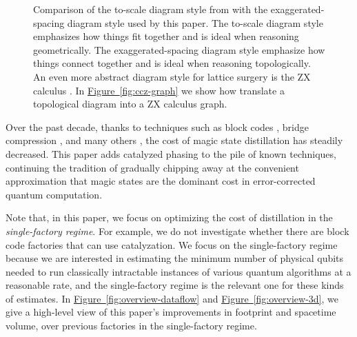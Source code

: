 \documentclass[twocolumn,accepted=2019-03-30]{quantumarticle}
\newcommand{\fig}[1]{\hyperref[fig:#1]{Figure~\ref*{fig:#1}}}
\begin{document}
\begin{figure}
  \label{fig:diagram-style-3d}
  \caption{
    Comparison of the to-scale diagram style from \cite{fowler2018} with the exaggerated-spacing diagram style used by this paper.
    The to-scale diagram style emphasizes how things fit together and is ideal when reasoning geometrically.
    The exaggerated-spacing diagram style emphasize how things connect together and is ideal when reasoning topologically.
    An even more abstract diagram style for lattice surgery is the ZX calculus \cite{de2017}.
    In \fig{ccz-graph} we show how translate a topological diagram into a ZX calculus graph.
  }
\end{figure}

Over the past decade, thanks to techniques such as block codes \cite{bravyi2012, fowler2013}, bridge compression \cite{fowler2012bridge}, and many others \cite{horsman2012, campbell2017, campbell2018, litinski2018}, the cost of magic state distillation has steadily decreased.
This paper adds catalyzed phasing to the pile of known techniques, continuing the tradition of gradually chipping away at the convenient approximation that magic states are the dominant cost in error-corrected quantum computation.

Note that, in this paper, we focus on optimizing the cost of distillation in the {\em single-factory regime}.
For example, we do not investigate whether there are block code factories that can use catalyzation.
We focus on the single-factory regime because we are interested in estimating the minimum number of physical qubits needed to run classically intractable instances of various quantum algorithms at a reasonable rate, and the single-factory regime is the relevant one for these kinds of estimates.
In \fig{overview-dataflow} and \fig{overview-3d}, we give a high-level view of this paper's improvements in footprint and spacetime volume, over previous factories in the single-factory regime.
\end{document}
